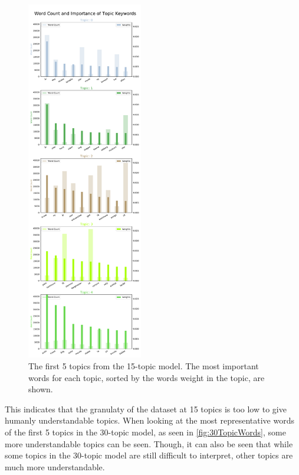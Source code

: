 \begin{figure}[h]
	\centering
	\includegraphics[width=0.45\textwidth]{figures/Word count and importance_corpus2017_document_model(15, 0.01, 0.1)(15, 0.01, 0.1)_topic 0-4.pdf}
	\caption{The first 5 topics from the 15-topic model.
	The most important words for each topic, sorted by the words weight in the topic, are shown.}
	\label{fig:15TopicWords}
\end{figure}

This indicates that the granulaty of the dataset at 15 topics is too low to give humanly understandable topics.
When looking at the most representative words of the first 5 topics in the 30-topic model, as seen in \autoref{fig:30TopicWords}, some more understandable topics can be seen.
Though, it can also be seen that while some topics in the 30-topic model are still difficult to interpret, other topics are much more understandable.

